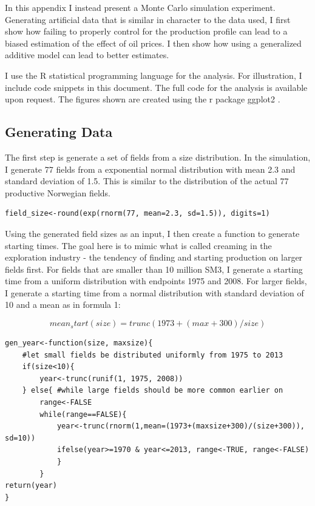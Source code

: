 \documentclass[11pt]{article}
\begin{document}
\begin{spacing}{1}
In this appendix I instead present a Monte Carlo simulation experiment.  Generating artificial data that is similar in character to the data used, I first show how failing to properly control for the production profile can lead to a biased estimation of the effect of oil prices.  I then show how using a generalized additive model can lead to better estimates.  

I use the R statistical programming language \citet{r_core_team_r:_2013} for the analysis.  For illustration, I include code snippets in this document.  The full code for the analysis is available upon request. The figures shown are created using the r package ggplot2 \citet{wickham_ggplot2:_2009}.

\subsection{Generating Data} 

The first step is generate a set of fields from a size distribution.  In the simulation, I generate 77 fields from a exponential normal distribution with mean 2.3 and standard deviation of 1.5.  This is similar to the distribution of the actual 77 productive Norwegian fields. 
\begin{verbatim}
field_size<-round(exp(rnorm(77, mean=2.3, sd=1.5)), digits=1)
\end{verbatim}

Using the generated field sizes as an input, I then create a function to generate starting times.  The goal here is to mimic what is called creaming in the exploration industry - the tendency of finding and starting production on larger fields first. For fields that are smaller than 10 million SM3, I generate a starting time from a uniform distribution with endpoints 1975 and 2008.  For larger fields, I generate a starting time from a normal distribution with standard deviation of 10 and a mean as in formula 1:

\begin{equation}
mean_start(size) = trunc(1973 + (max + 300)/size)
\end{equation}

\begin{verbatim}
gen_year<-function(size, maxsize){
	#let small fields be distributed uniformly from 1975 to 2013
	if(size<10){
		year<-trunc(runif(1, 1975, 2008))	
	} else{	#while large fields should be more common earlier on
		range<-FALSE
		while(range==FALSE){
			year<-trunc(rnorm(1,mean=(1973+(maxsize+300)/(size+300)), sd=10))
			ifelse(year>=1970 & year<=2013, range<-TRUE, range<-FALSE)
			}	
		}
return(year)	
}
\end{verbatim}


\end{spacing}
\end{document}
